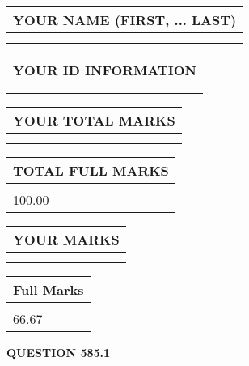 \documentclass{ctexart}
\begin{document}
   
   
   
\newpage 
\setcounter{page}{ 
   585001 } 
   
   
   
   
\noindent\begin{tabular}{|l|}
\hline
YOUR NAME (FIRST, ... LAST)  \\
\hline
 \\ 
 \\ 
\hline
\end{tabular}
\hspace{0.05in} \begin{tabular}{|l|}
\hline
 YOUR   ID   INFORMATION  \\
\hline
 \\ 
 \\ 
\hline
\end{tabular}
   
   
\vspace{0.2in}\noindent\begin{tabular}{|l|}
\hline
YOUR TOTAL MARKS  \\
\hline
 \\ 
 \\ 
\hline
\end{tabular}
\hspace{0.05in} \begin{tabular}{|l|}
\hline
TOTAL FULL MARKS  \\
\hline
 \\ 
100.00 \\
\hline
\end{tabular}
   
   
 \vspace{0.2in}
 
 
 
 
   
   
  
\vspace{0.2in}
  
\noindent\begin{tabular}{|l|}
\hline
 YOUR MARKS  \\
\hline
 \\ 
 \\ 
\hline
\end{tabular}
\hspace{0.05in} \begin{tabular}{|l|}
\hline
 Full Marks  \\
\hline
 \\ 
66.67 \\
\hline
\end{tabular}
{\textbf{\Large{QUESTION
585.1 
}}}
  
\end{document}
